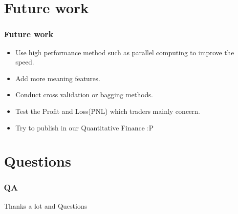 \documentclass[xcolor={x11names,svgnames,dvipsnames}]{beamer}
\begin{document}
\section{Future work}
\begin{frame}
\frametitle{Future work}
    \begin{itemize}
        \item  Use high performance method such as parallel computing to improve the speed.
        \item  Add more meaning features.
        \item  Conduct cross validation or bagging methods.
        \item  Test the Profit and Loss(PNL) which traders mainly concern.
        \item  Try to publish in our Quantitative Finance :P
      \end{itemize}
\end{frame}

\section{Questions}

\begin{frame}
\frametitle{QA}
\begin{center}
\huge{Thanks a lot and Questions}
\end{center}
\end{frame}
\end{document}

